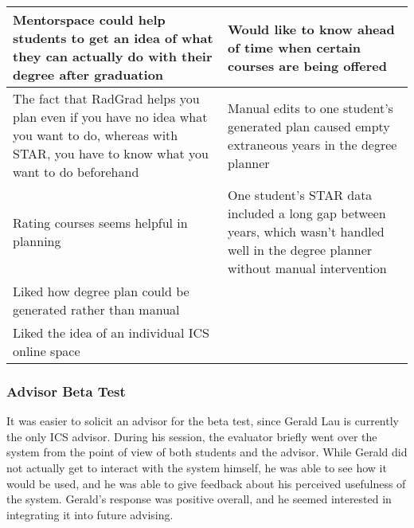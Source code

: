 \begin{table}[htbp!]
\begin{tabular}{ |p{8cm}|p{8cm}|}
 \hline
Mentorspace could help students to get an idea of what they can actually do with their degree after graduation &Would like to know ahead of time when certain courses are being offered\\
 \hline
The fact that RadGrad helps you plan even if you have no idea what you want to do, whereas with STAR, you have to know what you want to do beforehand & Manual edits to one student's generated plan caused empty extraneous years in the degree planner\\
 \hline
Rating courses seems helpful in planning & One student's STAR data included a long gap between years, which wasn't handled well in the degree planner without manual intervention\\
 \hline
Liked how degree plan could be generated rather than manual &\\
 \hline
Liked the idea of an individual ICS online space &\\
 \hline
\end{tabular}
\label{table:student-beta-test-results}
\end{table}

\subsubsection{Advisor Beta Test}

It was easier to solicit an advisor for the beta test, since Gerald Lau is currently the only ICS advisor. During his session, the evaluator briefly went over the system from the point of view of both students and the advisor. While Gerald did not actually get to interact with the system himself, he was able to see how it would be used, and he was able to give feedback about his perceived usefulness of the system. Gerald's response was positive overall, and he seemed interested in integrating it into future advising.